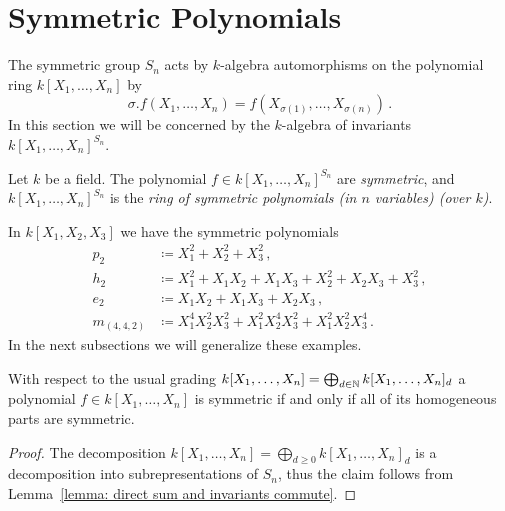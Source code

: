 \section{Symmetric Polynomials}


\begin{fluff}
  The symmetric group $S_n$ acts by $k$-algebra automorphisms on the polynomial ring $k[X_1, \dotsc, X_n]$ by
  \[
      \sigma.f(X_1, \dotsc, X_n)
    = f(X_{\sigma(1)}, \dotsc, X_{\sigma(n)}) \,.
  \]
  In this section we will be concerned by the $k$-algebra of invariants $k[X_1, \dotsc, X_n]^{S_n}$.
\end{fluff}


\begin{definition}
  Let $k$ be a field.
  The polynomial $f \in k[X_1, \dotsc, X_n]^{S_n}$ are \emph{symmetric}, and $k[X_1, \dotsc, X_n]^{S_n}$ is the \emph{ring of symmetric polynomials \textup(in $n$ variables\textup) \textup(over $k$\textup)}.
\end{definition}


\begin{example}
  \label{example: symmetric polynomials}
  In $k[X_1, X_2, X_3]$ we have the symmetric polynomials
  \begin{align*}
                p_2
    &\coloneqq  X_1^2 + X_2^2 + X_3^2 \,,
    \\
                h_2
    &\coloneqq  X_1^2 + X_1 X_2 + X_1 X_3 + X_2^2 + X_2 X_3 + X_3^2 \,,
    \\
                e_2
    &\coloneqq  X_1 X_2 + X_1 X_3 + X_2 X_3 \,,
    \\
                m_{(4,4,2)}
    &\coloneqq  X_1^4 X_2^2 X_3^2 + X_1^2 X_2^4 X_3^2 + X_1^2 X_2^2 X_3^4 \,.
  \end{align*}
  In the next subsections we will generalize these examples.
\end{example}


\begin{lemma}
  \label{lemma: symmetric iff all homogeneous parts are symmetric}
  With respect to the usual grading $k[X_1, \dotsc, X_n] = \bigoplus_{d \in \mathbb{N}} k[X_1, \dotsc, X_n]_d$ a polynomial $f \in k[X_1, \dotsc, X_n]$ is symmetric if and only if all of its homogeneous parts are symmetric.
\end{lemma}


\begin{proof}
  The decomposition $k[X_1, \dotsc, X_n] = \bigoplus_{d \geq 0} k[X_1, \dotsc, X_n]_d$ is a decomposition into subrepresentations of $S_n$, thus the claim follows from Lemma~\ref{lemma: direct sum and invariants commute}.
\end{proof}

